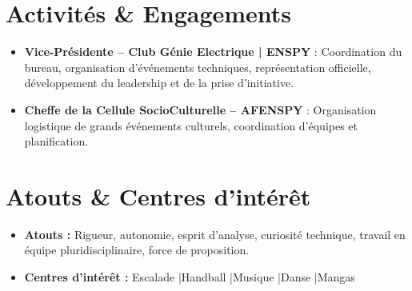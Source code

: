 \documentclass[a4paper,11pt]{article}
\begin{document}
\vspace{1pt}

\section{Activités \& Engagements}
\begin{itemize}[leftmargin=*, nosep, label={-}]
    \item \small{\textbf{Vice-Présidente -- Club Génie Electrique | ENSPY} : Coordination du bureau, organisation d'événements techniques, représentation officielle, développement du leadership et de la prise d'initiative.}
    \item \small{\textbf{Cheffe de la Cellule SocioCulturelle -- AFENSPY} : Organisation logistique de grands événements culturels, coordination d'équipes et planification.}
\end{itemize}

\vspace{1pt}

\section{Atouts \& Centres d'intérêt}
\begin{itemize}[leftmargin=*, nosep, label=\tiny$\bullet$]
    \item \small{\textbf{Atouts :} Rigueur, autonomie, esprit d'analyse, curiosité technique, travail en équipe pluridisciplinaire, force de proposition.}
    \item \small{\textbf{Centres d'intérêt :} Escalade \quad|\quad Handball \quad|\quad Musique \quad|\quad Danse \quad|\quad Mangas}
\end{itemize}
\end{document}
